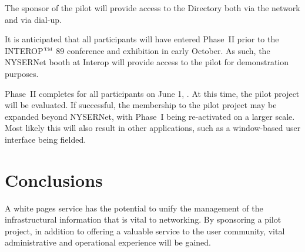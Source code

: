 The sponsor of the pilot will provide access to the Directory both via
the network and via dial-up.

It is anticipated that all participants will have entered Phase~II prior
to the INTEROP$^{\hbox{\tiny TM}}$ 89 conference and exhibition in early
October.
As such,
the NYSERNet booth at Interop will provide access to the pilot for
demonstration purposes.

Phase~II completes for all participants on June 1, {}.
At this time, the pilot project will be evaluated.
If successful,
the membership to the pilot project may be expanded beyond NYSERNet,
with Phase~I being re-activated on a larger scale.
Most likely this will also result in other applications,
such as a window-based user interface being fielded.

\section	{Conclusions}
A white pages service has the potential to unify the management of the
infrastructural information that is vital to networking.
By sponsoring a pilot project,
in addition to offering a valuable service to the user community,
vital administrative and operational experience will be gained.

\showsummary


